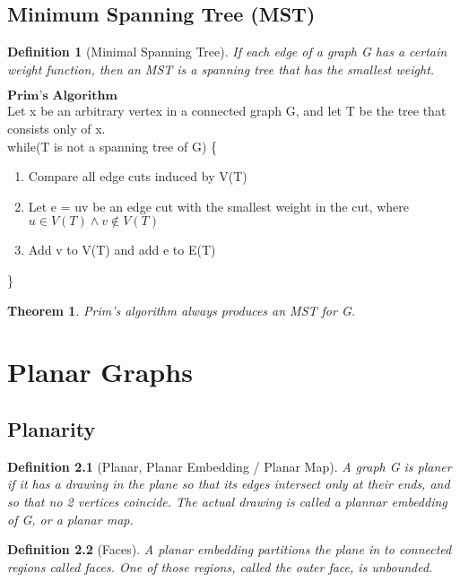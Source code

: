 \documentclass[11pt, oneside]{book}
\theoremstyle{break}
\newtheorem{thm}{Theorem}[section]
\newtheorem{defn}{Definition}[section]
\begin{document}
\section{Minimum Spanning Tree (MST)}

\begin{defn}[Minimal Spanning Tree]
	If each edge of a graph G has a certain weight function, then an MST is a spanning tree that has the smallest weight.
\end{defn}

$\textbf{Prim's Algorithm}$ \\
Let x be an arbitrary vertex in a connected graph G, and let T be the tree that consists only of x. \\
while(T is not a spanning tree of G) \{
	\begin{enumerate}
		\item Compare all edge cuts induced by V(T)
		\item Let e = uv be an edge cut with the smallest weight in the cut, where $u \in V(T) \land v \notin V(T)$
		\item Add v to V(T) and add e to E(T)
	\end{enumerate}
\}

\begin{thm}
	Prim's algorithm always produces an MST for G.
\end{thm}



\chapter{Planar Graphs}


\section{Planarity}

\begin{defn}[Planar, Planar Embedding / Planar Map]
	A graph G is planer if it has a drawing in the plane so that its edges intersect only at their ends, and so that no 2 vertices coincide. The actual drawing is called a plannar embedding of G, or a planar map.
\end{defn}

\begin{defn}[Faces]
	A planar embedding partitions the plane in to connected regions called faces. One of those regions, called the outer face, is unbounded.
\end{defn}
\end{document}
